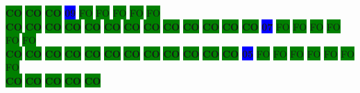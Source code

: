 \colorbox{green}{\color[rgb]{0,0,0}\textbf{CO}}%
\colorbox{green}{\color[rgb]{0,0,0}\textbf{CO}}%
\colorbox{green}{\color[rgb]{0,0,0}\textbf{CO}}%
\colorbox{blue}{\color[rgb]{1,0,0}\textbf{09}}%
\colorbox{green}{\color[gray]{0.75}FO}%
\colorbox{green}{\color[gray]{0.75}FO}%
\colorbox{green}{\color[gray]{0.75}FO}%
\colorbox{green}{\color[gray]{0.75}FO}%
\colorbox{green}{\color[gray]{0.75}FO}%
\\
\colorbox{green}{\color[rgb]{0,0,0}\textbf{CO}}%
\colorbox{green}{\color[rgb]{0,0,0}\textbf{CO}}%
\colorbox{green}{\color[rgb]{0,0,0}\textbf{CO}}%
\colorbox{green}{\color[rgb]{0,0,0}\textbf{CO}}%
\colorbox{green}{\color[rgb]{0,0,0}\textbf{CO}}%
\colorbox{green}{\color[rgb]{0,0,0}\textbf{CO}}%
\colorbox{green}{\color[rgb]{0,0,0}\textbf{CO}}%
\colorbox{green}{\color[rgb]{0,0,0}\textbf{CO}}%
\colorbox{green}{\color[rgb]{0,0,0}\textbf{CO}}%
\colorbox{green}{\color[rgb]{0,0,0}\textbf{CO}}%
\colorbox{green}{\color[rgb]{0,0,0}\textbf{CO}}%
\colorbox{green}{\color[rgb]{0,0,0}\textbf{CO}}%
\colorbox{green}{\color[rgb]{0,0,0}\textbf{CO}}%
\colorbox{blue}{\color[rgb]{1,0,0}\textbf{07}}%
\colorbox{green}{\color[gray]{0.75}FO}%
\colorbox{green}{\color[gray]{0.75}FO}%
\colorbox{green}{\color[gray]{0.75}FO}%
\colorbox{green}{\color[gray]{0.75}FO}%
\colorbox{green}{\color[gray]{0.75}FO}%
\colorbox{green}{\color[gray]{0.75}FO}%
\\
\colorbox{green}{\color[rgb]{0,0,0}\textbf{CO}}%
\colorbox{green}{\color[rgb]{0,0,0}\textbf{CO}}%
\colorbox{green}{\color[rgb]{0,0,0}\textbf{CO}}%
\colorbox{green}{\color[rgb]{0,0,0}\textbf{CO}}%
\colorbox{green}{\color[rgb]{0,0,0}\textbf{CO}}%
\colorbox{green}{\color[rgb]{0,0,0}\textbf{CO}}%
\colorbox{green}{\color[rgb]{0,0,0}\textbf{CO}}%
\colorbox{green}{\color[rgb]{0,0,0}\textbf{CO}}%
\colorbox{green}{\color[rgb]{0,0,0}\textbf{CO}}%
\colorbox{green}{\color[rgb]{0,0,0}\textbf{CO}}%
\colorbox{green}{\color[rgb]{0,0,0}\textbf{CO}}%
\colorbox{green}{\color[rgb]{0,0,0}\textbf{CO}}%
\colorbox{blue}{\color[rgb]{1,0,0}\textbf{05}}%
\colorbox{green}{\color[gray]{0.75}FO}%
\colorbox{green}{\color[gray]{0.75}FO}%
\colorbox{green}{\color[gray]{0.75}FO}%
\colorbox{green}{\color[gray]{0.75}FO}%
\colorbox{green}{\color[gray]{0.75}FO}%
\colorbox{green}{\color[gray]{0.75}FO}%
\colorbox{green}{\color[gray]{0.75}FO}%
\\
\colorbox{green}{\color[rgb]{0,0,0}\textbf{CO}}%
\colorbox{green}{\color[rgb]{0,0,0}\textbf{CO}}%
\colorbox{green}{\color[rgb]{0,0,0}\textbf{CO}}%
\colorbox{green}{\color[rgb]{0,0,0}\textbf{CO}}%
\colorbox{green}{\color[rgb]{0,0,0}\textbf{CO}}%
